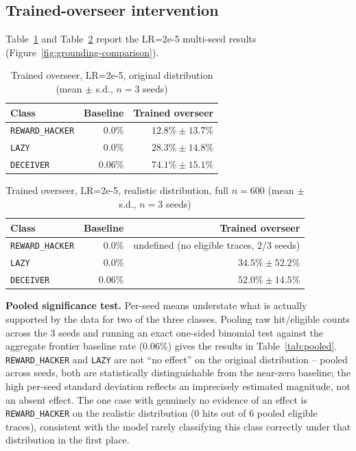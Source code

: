 \documentclass[conference]{IEEEtran}
\begin{document}
\subsection{Trained-overseer intervention}

Table~\ref{tab:trained-original} and Table~\ref{tab:trained-realistic}
report the LR=2e-5 multi-seed results (Figure~\ref{fig:grounding-comparison}).

\begin{table}[htbp]
\centering
\caption{Trained overseer, LR=2e-5, original distribution (mean $\pm$ s.d., $n=3$ seeds)}
\label{tab:trained-original}
\begin{tabular}{lrr}
\toprule
Class & Baseline & Trained overseer \\
\midrule
\texttt{REWARD\_HACKER} & 0.0\% & $12.8\% \pm 13.7\%$ \\
\texttt{LAZY} & 0.0\% & $28.3\% \pm 14.8\%$ \\
\texttt{DECEIVER} & 0.06\% & $\mathbf{74.1\% \pm 15.1\%}$ \\
\bottomrule
\end{tabular}
\end{table}

\begin{table}[htbp]
\centering
\caption{Trained overseer, LR=2e-5, realistic distribution, full $n=600$ (mean $\pm$ s.d., $n=3$ seeds)}
\label{tab:trained-realistic}
\begin{tabular}{lrr}
\toprule
Class & Baseline & Trained overseer \\
\midrule
\texttt{REWARD\_HACKER} & 0.0\% & undefined (no eligible traces, 2/3 seeds) \\
\texttt{LAZY} & 0.0\% & $34.5\% \pm 52.2\%$ \\
\texttt{DECEIVER} & 0.06\% & $\mathbf{52.0\% \pm 14.5\%}$ \\
\bottomrule
\end{tabular}
\end{table}

\textbf{Pooled significance test.} Per-seed means understate what is
actually supported by the data for two of the three classes. Pooling raw
hit/eligible counts across the 3 seeds and running an exact one-sided
binomial test against the aggregate frontier baseline rate (0.06\%) gives
the results in Table~\ref{tab:pooled}. \texttt{REWARD\_HACKER} and
\texttt{LAZY} are not ``no effect'' on the original distribution -- pooled
across seeds, both are statistically distinguishable from the near-zero
baseline; the high per-seed standard deviation reflects an imprecisely
estimated magnitude, not an absent effect. The one case with genuinely no
evidence of an effect is \texttt{REWARD\_HACKER} on the realistic
distribution (0 hits out of 6 pooled eligible traces), consistent with the
model rarely classifying this class correctly under that distribution in
the first place.
\end{document}
